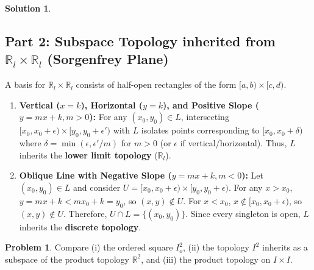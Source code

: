 \documentclass[11pt, a4paper]{article}
\theoremstyle{definition}
\newtheorem{problem}{Problem}
\newtheorem*{solution}{Solution}
\begin{document}
\begin{solution}
\subsection*{Part 2: Subspace Topology inherited from $\mathbb{R}_l \times \mathbb{R}_l$ (Sorgenfrey Plane)}
A basis for $\mathbb{R}_l \times \mathbb{R}_l$ consists of half-open rectangles of the form $[a, b) \times [c, d)$.

\begin{enumerate}[label=(\alph*)]
    \item \textbf{Vertical ($x = k$), Horizontal ($y = k$), and Positive Slope ($y = mx + k, m > 0$):}
    For any $(x_0, y_0) \in L$, intersecting $[x_0, x_0+\epsilon) \times [y_0, y_0+\epsilon')$ with $L$ isolates points corresponding to $[x_0, x_0 + \delta)$ where $\delta = \min(\epsilon, \epsilon'/m)$ for $m>0$ (or $\epsilon$ if vertical/horizontal). Thus, $L$ inherits the \textbf{lower limit topology} ($\mathbb{R}_l$).

    \item \textbf{Oblique Line with Negative Slope ($y = mx + k, m < 0$):}
    Let $(x_0, y_0) \in L$ and consider $U = [x_0, x_0+\epsilon) \times [y_0, y_0+\epsilon)$.
    For any $x > x_0$, $y = mx + k < m x_0 + k = y_0$, so $(x, y) \notin U$.
    For $x < x_0$, $x \notin [x_0, x_0+\epsilon)$, so $(x, y) \notin U$.
    Therefore, $U \cap L = \{(x_0, y_0)\}$. Since every singleton is open, $L$ inherits the \textbf{discrete topology}.
\end{enumerate}
\end{solution}

\vspace{1em}

\begin{problem}
Compare (i) the ordered square $I_o^2$, (ii) the topology $I^2$ inherits as a subspace of the product topology $\mathbb{R}^2$, and (iii) the product topology on $I \times I$.
\end{problem}
\end{document}
